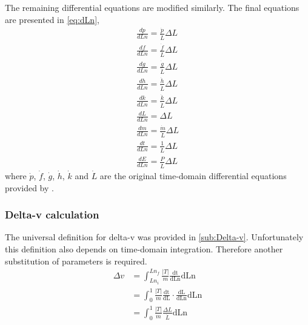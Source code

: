 The remaining differential equations are modified similarly. The final equations are presented in \eqref{eq:dLn},
\begin{subequations} \label{eq:dLn}
\begin{gather}
\frac{dp}{dLn}=\frac{\dot{p}}{\dot{L}}\Delta L \\
\frac{df}{dLn}=\frac{\dot{f}}{\dot{L}}\Delta L \\
\frac{dg}{dLn}=\frac{\dot{g}}{\dot{L}}\Delta L \\
\frac{dh}{dLn}=\frac{\dot{h}}{\dot{L}}\Delta L \\
\frac{dk}{dLn}=\frac{\dot{k}}{\dot{L}}\Delta L \\
\frac{dL}{dLn}=\Delta L \\
\frac{dm}{dLn}=\frac{\dot{m}}{\dot{L}}\Delta L \\
\frac{dt}{dLn}=\frac{1}{\dot{L}}\Delta L \\
\frac{dE}{dLn}=\frac{P}{\dot{L}}\Delta L 
\end{gather}
\end{subequations}
where $\dot{p}$, $\dot{f}$,  $\dot{g}$, $\dot{h}$, $\dot{k}$ and $\dot{L}$ are the original time-domain differential equations provided by \textcite{Walker1985}.

\subsubsection{Delta-v calculation}
The universal definition for delta-v was provided in \autoref{sub:Delta-v}. Unfortunately this definition also depends on time-domain integration. Therefore another substitution of parameters is required.
\begin{subequations}
\begin{align}
\Delta v &= \int^{Ln_f}_{Ln_i}\frac{|T|}{m}\frac{\text{dt}}{\text{dLn}}\text{dLn}\\
&= \int^{1}_{0}\frac{|T|}{m}\frac{\text{dt}}{\text{dL}}\cdot\frac{\text{dL}}{\text{dLn}}\text{dLn}\\
&= \int^{1}_{0}\frac{|T|}{m}\frac{\Delta L}{\dot L}\text{dLn}
\end{align}
\end{subequations}

